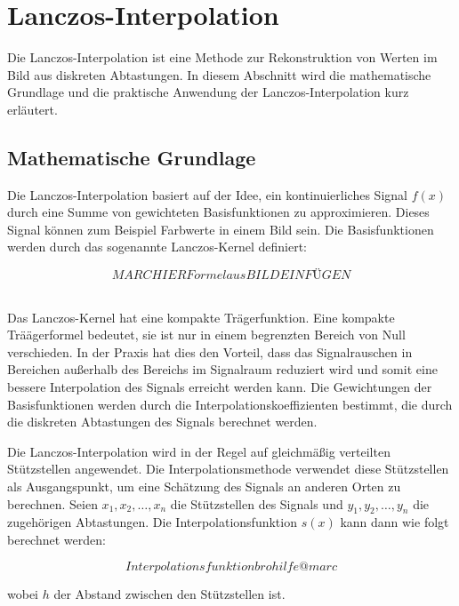 \section{Lanczos-Interpolation}
    Die Lanczos-Interpolation ist eine Methode zur Rekonstruktion von Werten im Bild aus diskreten Abtastungen. 
    In diesem Abschnitt wird die mathematische Grundlage und die praktische Anwendung der Lanczos-Interpolation kurz erläutert.

\subsection{Mathematische Grundlage}

    Die Lanczos-Interpolation basiert auf der Idee, ein kontinuierliches Signal $f(x)$ durch eine Summe von gewichteten Basisfunktionen zu approximieren. 
    Dieses Signal können zum Beispiel Farbwerte in einem Bild sein.
    Die Basisfunktionen werden durch das sogenannte Lanczos-Kernel definiert:

\begin{equation}
MARC HIER Formel aus BILD EINFÜGEN
\end{equation}
~

Das Lanczos-Kernel hat eine kompakte Trägerfunktion.
Eine kompakte Träägerformel bedeutet, sie ist nur in einem begrenzten Bereich von Null verschieden. 
In der Praxis hat dies den Vorteil, dass das Signalrauschen in Bereichen außerhalb des Bereichs im Signalraum reduziert wird und somit eine bessere Interpolation des Signals erreicht werden kann.
Die Gewichtungen der Basisfunktionen werden durch die Interpolationskoeffizienten bestimmt, die durch die diskreten Abtastungen des Signals berechnet werden.

Die Lanczos-Interpolation wird in der Regel auf gleichmäßig verteilten Stützstellen angewendet. 
Die Interpolationsmethode verwendet diese Stützstellen als Ausgangspunkt, um eine Schätzung des Signals an anderen Orten zu berechnen. 
Seien $x_1, x_2, \ldots, x_n$ die Stützstellen des Signals und $y_1, y_2, \ldots, y_n$ die zugehörigen Abtastungen.
Die Interpolationsfunktion $s(x)$ kann dann wie folgt berechnet werden:

\begin{equation}
Interpolationsfunktion bro hilfe @marc
\end{equation}

wobei $h$ der Abstand zwischen den Stützstellen ist.
~

